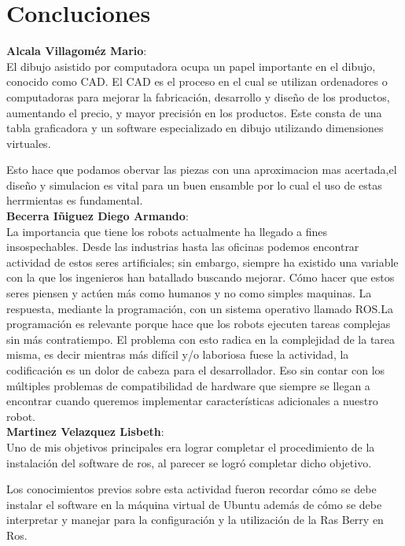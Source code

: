 \documentclass[letter,openrigth,12pt,spanish]{report}
\begin{document}
\section{Concluciones}

\textbf{Alcala Villagom\'ez Mario}:\\
El dibujo asistido por computadora ocupa un papel importante en el dibujo, conocido como CAD. El CAD es el proceso en el cual se utilizan ordenadores o computadoras para mejorar la fabricación, desarrollo y diseño de los productos, aumentando el precio, y mayor precisión en los productos. Este consta de una tabla graficadora y un software especializado en dibujo utilizando dimensiones virtuales. 

Esto hace que podamos obervar las piezas con una aproximacion mas acertada,el diseño y simulacion es vital para un buen ensamble por lo cual el uso de estas herrmientas es fundamental.\\

\textbf{Becerra Iñiguez Diego Armando}:\\
La importancia que tiene los robots actualmente ha llegado a fines insospechables. Desde las industrias hasta las oficinas podemos encontrar actividad de estos seres artificiales; sin embargo, siempre ha existido una variable con la que los ingenieros han batallado buscando mejorar. Cómo hacer que estos seres piensen y act\'uen m\'as como humanos y no como simples maquinas. La respuesta, mediante la programación, con un sistema operativo llamado ROS.La programaci\'on es relevante porque hace que los robots ejecuten tareas complejas sin m\'as contratiempo. El problema con esto radica en la complejidad de la tarea misma, es decir mientras m\'as dif\'icil y/o laboriosa fuese la actividad, la codificaci\'on es un dolor de cabeza para el desarrollador. Eso sin contar con los m\'ultiples problemas de compatibilidad de hardware que siempre se llegan a encontrar cuando queremos implementar características adicionales a nuestro robot.\\

\textbf{Martinez Velazquez Lisbeth}:\\
Uno de mis objetivos principales era lograr completar el procedimiento de la instalación del software de ros, al parecer se logr\'o completar dicho objetivo.

Los conocimientos previos sobre esta actividad fueron recordar cómo se debe instalar el software en la máquina virtual de Ubuntu además de cómo se debe interpretar y manejar para la configuración y la utilización de la Ras Berry en Ros.\\
\end{document}
